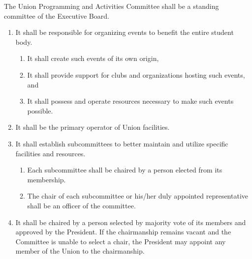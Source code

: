\item The Union Programming and Activities Committee shall be a standing committee of the Executive Board.

\begin{enumerate}

\item It shall be responsible for organizing events to benefit the entire student body. 

\begin{enumerate}

\item It shall create such events of its own origin, 

\item It shall provide support for clubs and organizations hosting such events, and

\item It shall possess and operate resources necessary to make such events possible. 

\end{enumerate}

\item It shall be the primary operator of Union facilities. 

\item It shall establish subcommittees to better maintain and utilize specific facilities and resources. 

\begin{enumerate}

\item Each subcommittee shall be chaired by a person elected from its membership.

\item The chair of each subcommittee or his/her duly appointed representative shall be an officer of the committee.

\end{enumerate}

\item It shall be chaired by a person selected by majority vote of its members and approved by the President. If the chairmanship remains vacant and the Committee is unable to select a chair, the President may appoint any member of the Union to the chairmanship.

\end{enumerate}